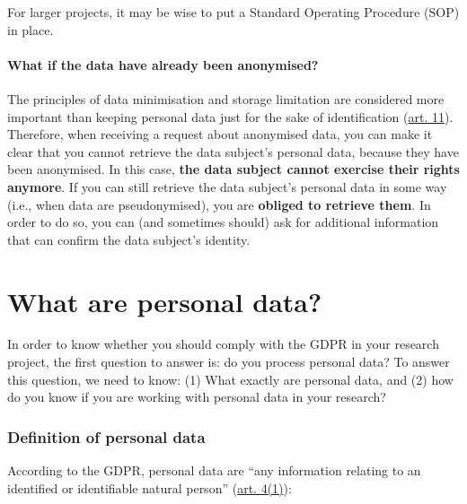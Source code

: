 \documentclass[
]{book}
\begin{document}
For larger projects, it may be wise to put a Standard Operating Procedure (SOP)
in place.

\hypertarget{what-if-the-data-have-already-been-anonymised}{%
\subsubsection{What if the data have already been anonymised?}\label{what-if-the-data-have-already-been-anonymised}}

The principles of data minimisation and storage limitation are considered more
important than keeping personal data just for the sake of identification
(\href{https://gdpr-info.eu/art-11-gdpr/}{art. 11}).
Therefore, when receiving a request about anonymised data, you can make it clear
that you cannot retrieve the data subject's personal data, because they have
been anonymised. In this case, \textbf{the data subject cannot exercise their rights
anymore}. If you can still retrieve the data subject's personal data in some
way (i.e., when data are pseudonymised), you are \textbf{obliged to retrieve them}.
In order to do so, you can (and sometimes should) ask for additional information
that can confirm the data subject's identity.

\hypertarget{personal-data}{%
\chapter{What are personal data?}\label{personal-data}}

In order to know whether you should comply with the GDPR in your research
project, the first question to answer is: do you process personal data? To
answer this question, we need to know: (1) What exactly are personal data,
and (2) how do you know if you are working with personal data in your research?

\hypertarget{definition-personal-data}{%
\subsection{Definition of personal data}\label{definition-personal-data}}

According to the GDPR, personal data are ``any information relating to an
identified or identifiable natural person''
(\href{https://gdpr-info.eu/art-4-gdpr/}{art. 4(1)}):
\end{document}
